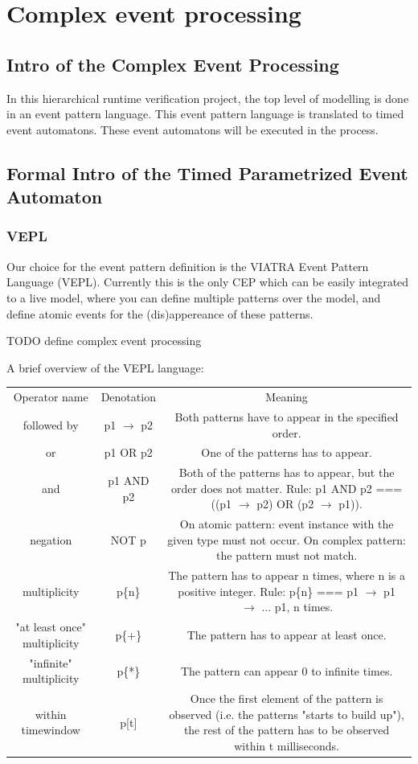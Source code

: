 \chapter{Complex event processing}
	\label{chap:cep}
	\section{Intro of the Complex Event Processing}
		In this hierarchical runtime verification project, the top level of modelling is done in an event pattern language.
		This event pattern language is translated to timed event automatons. These event automatons will be executed in the
		process.
	\section{Formal Intro of the Timed Parametrized Event Automaton}
		\subsection{VEPL}
			Our choice for the event pattern definition is the VIATRA Event Pattern Language (VEPL).
			Currently this is the only CEP which can be easily integrated to a live model, where 
			you can define multiple patterns over the model, and define atomic events for the (dis)appereance
			of these patterns.
			
			TODO define complex event processing
			
			A brief overview of the VEPL language:

\begin{tabular}{ccc}
\centering
Operator name &	Denotation & Meaning \\
followed by & p1 $\rightarrow$ p2 & Both patterns have to appear in the specified order. \\
or &	p1 OR p2 &	One of the patterns has to appear. \\
and &	p1 AND p2 &	Both of the patterns has to appear, but the order does not matter. Rule: p1 AND p2 === ((p1 $\rightarrow$ p2) OR (p2 $\rightarrow$ p1)). \\
negation &	NOT p &	On atomic pattern: event instance with the given type must not occur. On complex pattern: the pattern must not match. \\
multiplicity &	p\{n\} &	The pattern has to appear n times, where n is a positive integer. Rule: p\{n\} === p1 $\rightarrow$ p1 $\rightarrow$ ... p1, n times. \\
"at least once" multiplicity &	p\{+\} &	The pattern has to appear at least once. \\
"infinite" multiplicity &	p\{*\} &	The pattern can appear 0 to infinite times. \\
within timewindow &	p[t] &	Once the first element of the pattern is observed (i.e. the patterns "starts to build up"), the rest of the pattern has to be observed within t milliseconds.
\end{tabular}	
			
